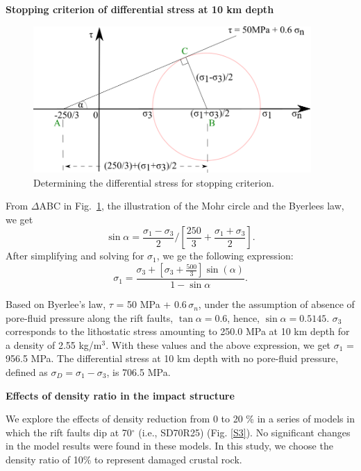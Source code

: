 \documentclass[draft,jgrga]{agutexSI2019}
\begin{document}
\begin{article}
\vspace{10mm} %

\noindent\textbf{Stopping criterion of differential stress at 10 km depth}

\begin{figure}[ht]
\includegraphics[width=25pc]{Figures/Calc_diff_stress.png}
\caption{Determining the differential stress for stopping criterion.}
\label{S2}
\end{figure}

\vspace{5mm} %

From $\Delta$ABC in Fig.~\ref{S2}, the illustration of the Mohr circle and the Byerlees law, we get
\[
 \sin \alpha = \frac{\sigma_{1}-\sigma_{3}}{2} / \left[\frac{250}{3} + \frac{\sigma_{1}+\sigma_{3}}{2} \right].
\]
%
After simplifying and solving for $\sigma_{1}$, we ge the following expression:
\[
 \sigma_{1} = \frac{\sigma_{3}+[\sigma_{3}+\frac{500}{3}] \sin(\alpha)}{1-\sin \alpha}.
\]

Based on Byerlee's law, $\tau$  = 50 MPa + 0.6$\,\sigma_n$, under the assumption of absence of pore-fluid pressure along the rift faults, $\tan \alpha = 0.6$, hence, $\sin \alpha = 0.5145$. $\sigma_{3}$ corresponds to the lithostatic stress amounting to 250.0 MPa at 10 km depth for a density of 2.55 kg/m$^{3}$. With these values and the above expression, we get $\sigma_{1}$ = 956.5 MPa. The differential stress at 10 km depth with no pore-fluid pressure, defined as $\sigma_{D} = \sigma_{1} - \sigma_{3}$, is 706.5 MPa. 

\vspace{10mm} %

\noindent\textbf{Effects of density ratio in the impact structure}

We explore the effects of density reduction from 0 to 20 \% in a series of models in which the rift faults dip at 70$^{\circ}$ (i.e., SD70R25) (Fig. \ref{S3}). No significant changes in the model results were found in these models. In this study, we choose the density ratio of 10\% to represent damaged crustal rock. 
\vspace{10mm} %


\end{article}
\end{document}
